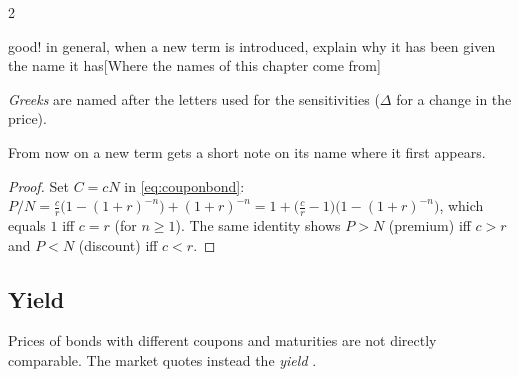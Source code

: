 \begin{paracol}{2}
\begin{answer}{good! in general, when a new term is introduced, explain why it has been given the name it has}[Where the names of this chapter come from]
\begin{itemize}
        \emph{Greeks} are named after the letters used for the sensitivities ($\Delta$ for a change in the price).
\end{itemize}
From now on a new term gets a short note on its name where it first appears.
\end{answer}
\begin{proof}
Set $C = cN$ in \eqref{eq:couponbond}:
$P/N = \frac{c}{r}\bigl(1-(1+r)^{-n}\bigr) + (1+r)^{-n} = 1 + \bigl(\tfrac{c}{r}-1\bigr)\bigl(1-(1+r)^{-n}\bigr)$,
which equals $1$ iff $c=r$ (for $n\ge1$). The same identity shows $P>N$ (premium) iff $c>r$
and $P<N$ (discount) iff $c<r$.
\end{proof}

\subsection{Yield}
Prices of bonds with different coupons and maturities are not directly comparable. The market
quotes instead the \emph{yield} .


\end{paracol}
